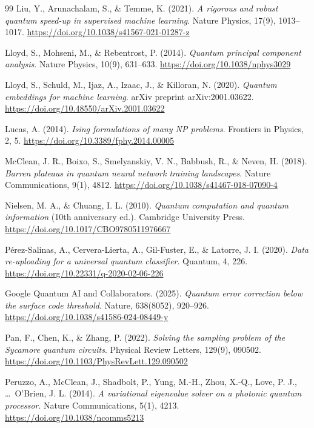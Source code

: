 \begin{thebibliography}{99}
	Liu, Y., Arunachalam, S., \& Temme, K. (2021).
	\emph{A rigorous and robust quantum speed-up in supervised machine learning}.
	Nature Physics, 17(9), 1013--1017.
	\url{https://doi.org/10.1038/s41567-021-01287-z}

	Lloyd, S., Mohseni, M., \& Rebentrost, P. (2014).
	\emph{Quantum principal component analysis}.
	Nature Physics, 10(9), 631--633.
	\url{https://doi.org/10.1038/nphys3029}

	Lloyd, S., Schuld, M., Ijaz, A., Izaac, J., \& Killoran, N. (2020).
	\emph{Quantum embeddings for machine learning}.
	arXiv preprint arXiv:2001.03622.
	\url{https://doi.org/10.48550/arXiv.2001.03622}

	Lucas, A. (2014).
	\emph{Ising formulations of many NP problems}.
	Frontiers in Physics, 2, 5.
	\url{https://doi.org/10.3389/fphy.2014.00005}

	McClean, J. R., Boixo, S., Smelyanskiy, V. N., Babbush, R., \& Neven, H. (2018).
	\emph{Barren plateaus in quantum neural network training landscapes}.
	Nature Communications, 9(1), 4812.
	\url{https://doi.org/10.1038/s41467-018-07090-4}

	Nielsen, M. A., \& Chuang, I. L. (2010).
	\emph{Quantum computation and quantum information} (10th anniversary ed.).
	Cambridge University Press.
	\url{https://doi.org/10.1017/CBO9780511976667}

	Pérez-Salinas, A., Cervera-Lierta, A., Gil-Fuster, E., \& Latorre, J. I. (2020).
	\emph{Data re-uploading for a universal quantum classifier}.
	Quantum, 4, 226.
	\url{https://doi.org/10.22331/q-2020-02-06-226}

	Google Quantum AI and Collaborators. (2025).
	\emph{Quantum error correction below the surface code threshold}.
	Nature, 638(8052), 920--926.
	\url{https://doi.org/10.1038/s41586-024-08449-y}

	Pan, F., Chen, K., \& Zhang, P. (2022).
	\emph{Solving the sampling problem of the Sycamore quantum circuits}.
	Physical Review Letters, 129(9), 090502.
	\url{https://doi.org/10.1103/PhysRevLett.129.090502}

	Peruzzo, A., McClean, J., Shadbolt, P., Yung, M.-H., Zhou, X.-Q., Love, P. J., \ldots\ O'Brien, J. L. (2014).
	\emph{A variational eigenvalue solver on a photonic quantum processor}.
	Nature Communications, 5(1), 4213.
	\url{https://doi.org/10.1038/ncomms5213}


\end{thebibliography}
